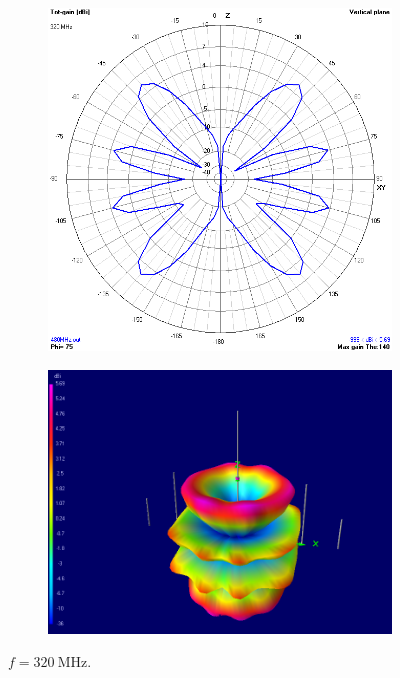 \begin{figure}[H]
	\begin{subfigure}{0.5\textwidth}
		\includegraphics[scale=0.43]{imagenes/2D_320MHz.png}
	\end{subfigure}	
	\quad
	\begin{subfigure}{0.5\textwidth}
		\includegraphics[scale=0.43]{imagenes/3D_320MHz.png}
	\end{subfigure}
	\caption{$f=\SI{320}{\mega\hertz}$.}
	\label{fig.radiacion_320M}
\end{figure}


